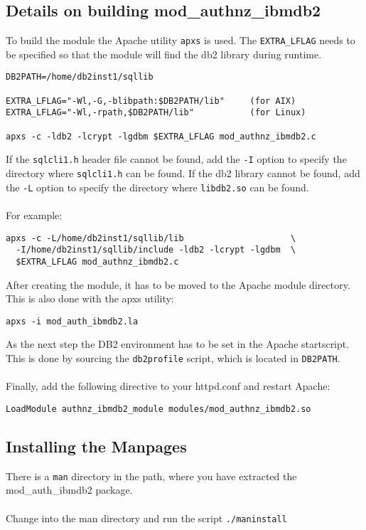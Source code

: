 \documentclass[11pt,a4paper]{article}
\begin{document}
\subsection{Details on building mod\_authnz\_ibmdb2}
To build the module the Apache utility {\tt apxs} is used. The {\tt EXTRA\_LFLAG} needs to be specified so that the module will find the db2 library during runtime.
\begin{verbatim}
DB2PATH=/home/db2inst1/sqllib

EXTRA_LFLAG="-Wl,-G,-blibpath:$DB2PATH/lib"     (for AIX)
EXTRA_LFLAG="-Wl,-rpath,$DB2PATH/lib"           (for Linux)

apxs -c -ldb2 -lcrypt -lgdbm $EXTRA_LFLAG mod_authnz_ibmdb2.c
\end{verbatim}
If the {\tt sqlcli1.h} header file cannot be found, add the {\tt -I} option to specify the
directory where {\tt sqlcli1.h} can be found.
If the db2 library cannot be found, add the {\tt -L} option to specify the
directory where {\tt libdb2.so} can be found.\\
\\
For example:
\begin{verbatim}
apxs -c -L/home/db2inst1/sqllib/lib                     \
  -I/home/db2inst1/sqllib/include -ldb2 -lcrypt -lgdbm  \
  $EXTRA_LFLAG mod_authnz_ibmdb2.c
\end{verbatim}
After creating the module, it has to be moved to the Apache module directory. This is also done with the apxs utility:
\begin{verbatim}
apxs -i mod_auth_ibmdb2.la
\end{verbatim}
As the next step the DB2 environment has to be set in the Apache startscript. This is done by sourcing the {\tt db2profile} script, which is located in {\tt DB2PATH}.\\
\\
Finally, add the following directive to your httpd.conf and restart Apache:
\begin{verbatim}
LoadModule authnz_ibmdb2_module modules/mod_authnz_ibmdb2.so
\end{verbatim}

\subsection{Installing the Manpages}
There is a {\tt man} directory in the path, where you have extracted the mod\_auth\_ibmdb2 package.\\ 
\\
Change into the man directory and run the script {\tt ./maninstall} 
\end{document}
